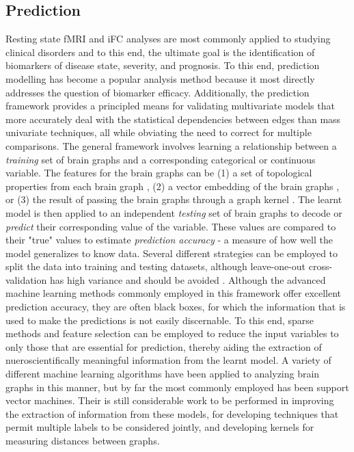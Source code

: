 \subsection{Prediction}

Resting state fMRI and iFC analyses are most commonly applied to studying clinical disorders and to this end, the ultimate goal is the identification of biomarkers of disease state, severity, and prognosis\cite{DiMartino}. To this end, prediction modelling has become a popular analysis method because it most directly addresses the question of biomarker efficacy\cite{craddock,Dosenbach,review}. Additionally, the prediction framework provides a principled means for validating multivariate models that more accurately deal with the statistical dependencies between edges than mass univariate techniques, all while obviating the need to correct for multiple comparisons. The general framework involves learning a relationship between a \emph{training} set of brain graphs and a corresponding categorical or continuous variable. The features for the brain graphs can be (1) a set of topological properties from each brain graph \cite{Cecci2009, Bassett2012}, (2) a vector embedding of the brain graphs \cite{Richiadi2013,Luo2003}, or (3) the result of passing the brain graphs through a graph kernel \cite{}. The learnt model is then applied to an independent \emph{testing} set of brain graphs to decode or \emph{predict} their corresponding value of the variable. These values are compared to their "true" values to estimate \emph{prediction accuracy} - a measure of how well the model generalizes to know data. Several different strategies can be employed to split the data into training and testing datasets, although leave-one-out cross-validation has high variance and should be avoided \cite{}. Although the advanced machine learning methods commonly employed in this framework offer excellent prediction accuracy, they are often black boxes, for which the information that is used to make the predictions is not easily discernable. To this end, sparse methods and feature selection can be employed to reduce the input variables to only those that are essential for prediction, thereby aiding the extraction of nueroscientifically meaningful information from the learnt model. A variety of different machine learning algorithms have been applied to analyzing brain graphs in this manner, but by far the most commonly employed has been support vector machines\cite{DiMartino}. Their is still considerable work to be performed in improving the extraction of information from these models, for developing techniques that permit multiple labels to be considered jointly, and developing kernels for measuring distances between graphs.

